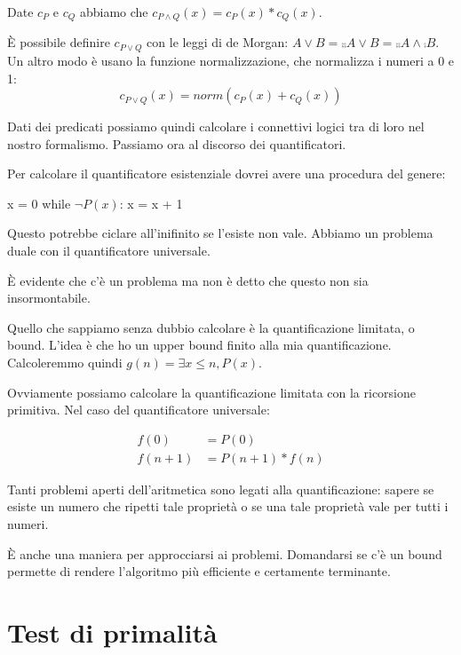 Date $c_{P}$ e $c_{Q}$ abbiamo che $c_{P \land Q}(x) = c_{P}(x) *
c_{Q}(x)$.

È possibile definire $c_{P \lor Q}$ con le leggi di de Morgan: $A \lor B = \comp{\comp{A \lor B}} =
\comp{\comp{A} \land \comp{B}}$. Un altro modo è usano la funzione normalizzazione, che normalizza i
numeri a 0 e 1:
\begin{equation*}
    c_{P \lor Q}(x) = \textit{norm}(c_{P}(x) + c_{Q}(x))
\end{equation*}

Dati dei predicati possiamo quindi calcolare i connettivi logici tra di loro nel nostro formalismo.
Passiamo ora al discorso dei quantificatori.

Per calcolare il quantificatore esistenziale dovrei avere una procedura del genere:

\begin{python}
x = 0
while $\lnot P(x)$:
    x = x + 1
\end{python}

Questo potrebbe ciclare all'inifinito se l'esiste non vale. Abbiamo un problema duale con il
quantificatore universale.

È evidente che c'è un problema ma non è detto che questo non sia insormontabile.

Quello che sappiamo senza dubbio calcolare è la quantificazione limitata, o bound. L'idea è che
ho un upper bound finito alla mia quantificazione. Calcoleremmo quindi $g(n) = \exists x \leq n,
P(x)$.

Ovviamente possiamo calcolare la quantificazione limitata con la ricorsione primitiva. Nel caso del
quantificatore universale:

\begin{align*}
    f(0) &= P(0) \\
    f(n+1) &= P(n+1)*f(n)
\end{align*}

Tanti problemi aperti dell'aritmetica sono legati alla quantificazione: sapere se esiste un numero
che ripetti tale proprietà o se una tale proprietà vale per tutti i numeri.

È anche una maniera per approcciarsi ai problemi. Domandarsi se c'è un bound permette di rendere
l'algoritmo più efficiente e certamente terminante.

\section{Test di primalità}

